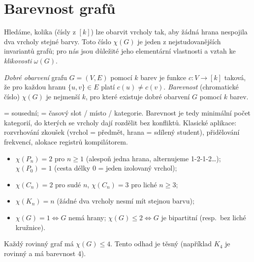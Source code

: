 \documentclass[11pt,a4paper]{article}
\newcommand{\chrom}{\chi}
\newcommand{\klik}{\omega}
\begin{document}
\section{Barevnost grafů}

Hledáme, kolika  (čísly z $[k]$) lze obarvit vrcholy tak, aby žádná hrana nespojila dva vrcholy stejné barvy. Toto číslo $\chrom(G)$ je jeden z nejstudovanějších invariantů grafů; pro nás jsou důležité jeho elementární vlastnosti a vztah ke \emph{klikovosti} $\klik(G)$.

\begin{definice}
\emph{Dobré obarvení} grafu $G=(V,E)$ pomocí $k$ barev je funkce $c\colon V\to[k]$ taková, že pro každou hranu $\{u,v\}\in E$ platí $c(u)\ne c(v)$. \emph{Barevnost} (chromatické číslo) $\chrom(G)$ je nejmenší $k$, pro které existuje dobré obarvení $G$ pomocí $k$ barev.
\end{definice}


\begin{intuice}
 = sousední;  = časový slot / místo / kategorie. Barevnost je tedy minimální počet kategorií, do kterých se vrcholy dají rozdělit bez konfliktů. Klasické aplikace: rozvrhování zkoušek (vrchol = předmět, hrana = sdílený student), přidělování frekvencí, alokace registrů kompilátorem.
\end{intuice}

\begin{poznamka}\leavevmode
\begin{itemize}
  \item $\chrom(P_n)=2$ pro $n\ge 1$ (alespoň jedna hrana, alternujeme 1-2-1-2\dots); $\chrom(P_0)=1$ (cesta délky 0 = jeden izolovaný vrchol);
  \item $\chrom(C_n)=2$ pro sudé $n$, $\chrom(C_n)=3$ pro liché $n\ge 3$;
  \item $\chrom(K_n)=n$ (žádné dva vrcholy nesmí mít stejnou barvu);
  \item $\chrom(G)=1\iff G$ nemá hrany; $\chrom(G)\le 2\iff G$ je bipartitní (resp.\ bez liché kružnice).
\end{itemize}
\end{poznamka}

\begin{veta}
Každý rovinný graf má $\chrom(G)\le 4$. Tento odhad je těsný (například $K_4$ je rovinný a má barevnost 4).
\end{veta}
\end{document}
